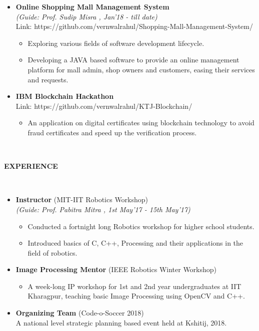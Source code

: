 \documentclass[a4paper,8pt]{article}
\newcommand{\isep}{-2 pt}
\newcommand{\lsep}{-0.5cm}
\newcommand{\resheading}[1]{{\small \colorbox{mygrey}{\begin{minipage}{0.975\textwidth}{\textbf{#1 \vphantom{p\^{E}}}}\end{minipage}}}}
\begin{document}
\begin{itemize}
\item \textbf{Online Shopping Mall Management System} \hspace{0.5cm} \\
\emph{(Guide: Prof. Sudip Misra
, Jan'18 - till date)} \\
Link: {https://github.com/vernwalrahul/Shopping-Mall-Management-System/}
\begin{itemize} \itemsep \isep
\item Exploring various fields of software development lifecycle.	
\item Developing a JAVA based software to provide an online management platform for mall admin, shop owners and customers, easing their services and requests.
\end{itemize}
	
\item \textbf{IBM Blockchain Hackathon} \\
Link: {https://github.com/vernwalrahul/KTJ-Blockchain/}
\begin{itemize} \itemsep \isep
\item An application on digital certificates using blockchain technology to avoid fraud certificates and speed up the verification process. 
\end{itemize}
\end{itemize}


\hspace{0.5cm}\\[-0.2cm]
\resheading{\textbf{ EXPERIENCE } }\\[\lsep]
\begin{itemize}
\item \textbf{Instructor} (MIT-IIT Robotics Workshop) \hspace{0.5cm}\\ 
\emph{(Guide: Prof. Pabitra Mitra
, 1st May'17 - 15th May'17)} \\[-0.6cm] 
\begin{itemize} \itemsep \isep
\item Conducted a fortnight long Robotics workshop for higher school students.
\item Introduced basics of C, C++, Processing and their applications in the field of robotics. \\
\end{itemize} 

\item \textbf{Image Processing Mentor} (IEEE Robotics Winter Workshop) \\
\begin{itemize}
\item A week-long IP workshop for 1st and 2nd year undergraduates at IIT Kharagpur, teaching basic Image Processing using OpenCV and C++.
\end{itemize}

\item \textbf{Organizing Team} (Code-o-Soccer 2018) \\
	A national level strategic planning based event held at Kshitij, 2018.	

\end{itemize}
\end{document}
